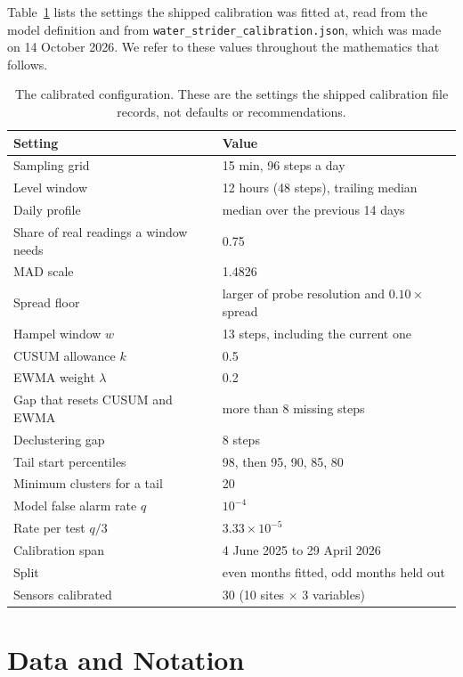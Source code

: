 \documentclass{article}
\begin{document}
Table~\ref{tab:config} lists the settings the shipped calibration was fitted
at, read from the model definition and from
\texttt{water\_strider\_calibration.json}, which was made on 14 October 2026.
We refer to these values throughout the mathematics that follows.

\begin{table}[t]
  \centering
  \caption{The calibrated configuration. These are the settings the shipped
    calibration file records, not defaults or recommendations.}
  \label{tab:config}
  \begin{tabular}{ll}
    \toprule
    Setting & Value \\
    \midrule
    Sampling grid & 15 min, 96 steps a day \\
    Level window & 12 hours (48 steps), trailing median \\
    Daily profile & median over the previous 14 days \\
    Share of real readings a window needs & 0.75 \\
    MAD scale & 1.4826 \\
    Spread floor & larger of probe resolution and $0.10 \times$ spread \\
    Hampel window $w$ & 13 steps, including the current one \\
    CUSUM allowance $k$ & 0.5 \\
    EWMA weight $\lambda$ & 0.2 \\
    Gap that resets CUSUM and EWMA & more than 8 missing steps \\
    Declustering gap & 8 steps \\
    Tail start percentiles & 98, then 95, 90, 85, 80 \\
    Minimum clusters for a tail & 20 \\
    Model false alarm rate $q$ & $10^{-4}$ \\
    Rate per test $q / 3$ & $3.33 \times 10^{-5}$ \\
    Calibration span & 4 June 2025 to 29 April 2026 \\
    Split & even months fitted, odd months held out \\
    Sensors calibrated & 30 (10 sites $\times$ 3 variables) \\
    \bottomrule
  \end{tabular}
\end{table}

\section{Data and Notation}
\label{sec:data}
\end{document}
